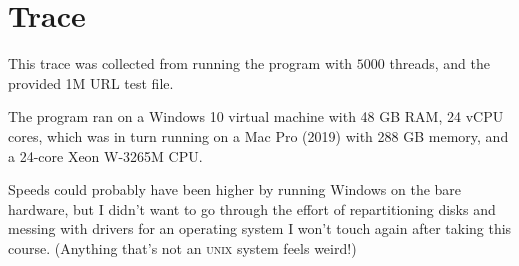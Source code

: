 \documentclass[11pt]{article}
\begin{document}
\section{Trace}
This trace was collected from running the program with $5000$ threads, and the provided 1M URL test file.  

The program ran on a Windows 10 virtual machine with 48 GB RAM, 24 vCPU cores, which was in turn running on a Mac Pro (2019) with 288 GB memory, and a 24-core Xeon W-3265M CPU. 

Speeds could probably have been higher by running Windows on the bare hardware, but I didn't want to go through the effort of repartitioning disks and messing with drivers for an operating system I won't touch again after taking this course. (Anything that's not an \textsc{unix} system feels weird!)
\end{document}

